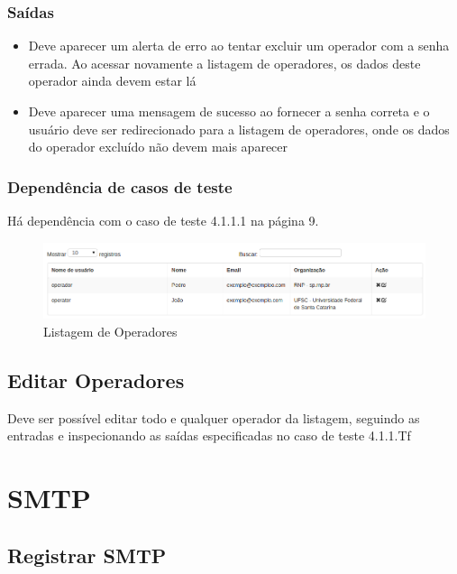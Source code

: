 \subsubsection{Saídas}

\begin{itemize}

	\item Deve aparecer um alerta de erro ao tentar excluir um operador com a senha errada. Ao acessar novamente a listagem de operadores, os dados deste operador ainda devem estar lá
	\item Deve aparecer uma mensagem de sucesso ao fornecer a senha correta e o usuário deve ser redirecionado para a listagem de operadores, onde os dados do operador excluído não devem mais aparecer
	
\end{itemize}

\subsubsection{Dependência de casos de teste}
Há dependência com o caso de teste 4.1.1.1 na página 9.

\begin{figure}[ht]
     \centering
     \includegraphics[scale=0.5]{images/listarop.png}
     \caption{Listagem de Operadores}
     \label{fig:listarop}
\end{figure}

\subsection{Editar Operadores}
    Deve ser possível editar todo e qualquer operador da listagem, seguindo as entradas e inspecionando as saídas especificadas no caso de teste 4.1.1.Tf

\section{SMTP}

\subsection{Registrar SMTP}

